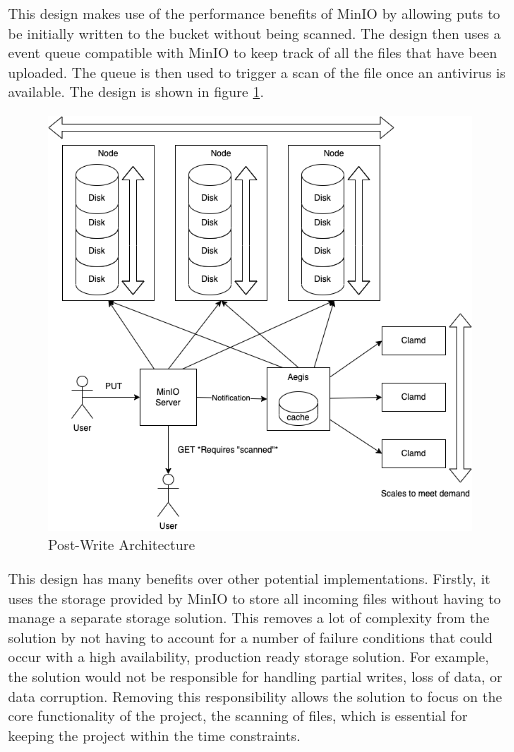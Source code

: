 \documentclass[12pt, conference, final, a4paper, onecolumn, compsoc]{IEEEtran}
\begin{document}
    This design makes use of the performance benefits of MinIO by allowing puts
    to be initially written to the bucket without being scanned. The design then
    uses a event queue compatible with MinIO to keep track of all the files that
    have been uploaded. The queue is then used to trigger a scan of the file
    once an antivirus is available. The design is shown in figure
    \ref{fig:postWriteArch}.

    \begin{figure}
      \includegraphics[scale=.4]{diagrams/post-write.png}
      \caption{Post-Write Architecture}
      \label{fig:postWriteArch}
    \end{figure}

    This design has many benefits over other potential implementations. Firstly,
    it uses the storage provided by MinIO to store all incoming files without
    having to manage a separate storage solution. This removes a lot of
    complexity from the solution by not having to account for a number of
    failure conditions that could occur with a high availability, production
    ready storage solution. For example, the solution would not be responsible
    for handling partial writes, loss of data, or data corruption. Removing this
    responsibility allows the solution to focus on the core functionality of the
    project, the scanning of files, which is essential for keeping the project
    within the time constraints.
\end{document}
